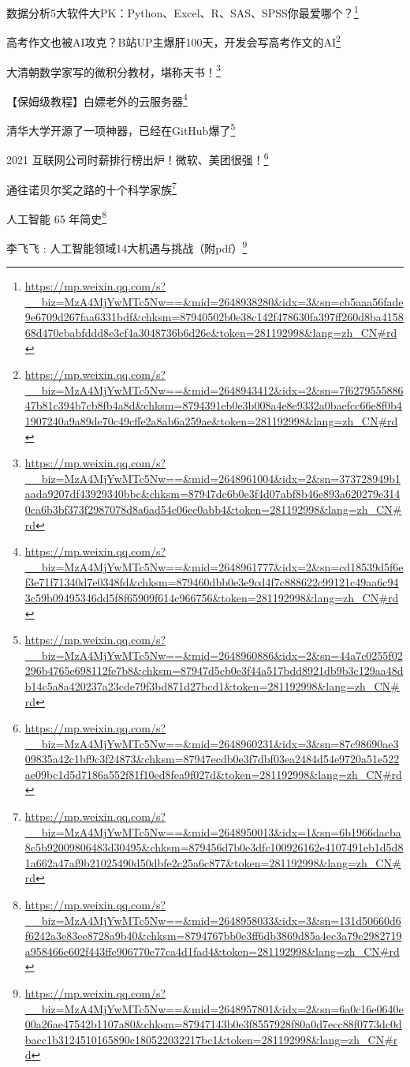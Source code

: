 \documentclass[]{ctexbook}
\renewcommand{\href}[2]{#2\footnote{\url{#1}}}
\begin{document}
\href{https://mp.weixin.qq.com/s?__biz=MzA4MjYwMTc5Nw==\&mid=2648938280\&idx=3\&sn=cb5aaa56fade9e6709d267faa6331bdf\&chksm=87940502b0e38c142f478630fa397ff260d8ba415868d470cbabfddd8e3cf4a3048736b6d26e\&token=281192998\&lang=zh_CN\#rd}{数据分析5大软件大PK：Python、Excel、R、SAS、SPSS你最爱哪个？}

\href{https://mp.weixin.qq.com/s?__biz=MzA4MjYwMTc5Nw==\&mid=2648943412\&idx=2\&sn=7f627955588647b81c394b7cb8fb4a8d\&chksm=8794391eb0e3b008a4e8e9332a0baefcc66e8f0b41907240a9a89de70c49cffe2a8ab6a259ae\&token=281192998\&lang=zh_CN\#rd}{高考作文也被AI攻克？B站UP主爆肝100天，开发会写高考作文的AI}

\href{https://mp.weixin.qq.com/s?__biz=MzA4MjYwMTc5Nw==\&mid=2648961004\&idx=2\&sn=373728949b1aada9207df43929340bbc\&chksm=87947dc6b0e3f4d07abf8b46e893a620279e3140ca6b3bf373f2987078d8a6ad54c06ec0abb4\&token=281192998\&lang=zh_CN\#rd}{大清朝数学家写的微积分教材，堪称天书！}

\href{https://mp.weixin.qq.com/s?__biz=MzA4MjYwMTc5Nw==\&mid=2648961777\&idx=2\&sn=cd18539d5f6ef3e71f71340d7e0348fd\&chksm=879460dbb0e3e9cd4f7c888622c99121c49aa6c943c59b09495346dd5f8f65909f614c966756\&token=281192998\&lang=zh_CN\#rd}{【保姆级教程】白嫖老外的云服务器}

\href{https://mp.weixin.qq.com/s?__biz=MzA4MjYwMTc5Nw==\&mid=2648960886\&idx=2\&sn=44a7c0255f02296b4765e698112fe7b8\&chksm=87947d5cb0e3f44a517bdd8921db9b3c129aa48db14c5a8a420237a23cde79f3bd871d27bcd1\&token=281192998\&lang=zh_CN\#rd}{清华大学开源了一项神器，已经在GitHub爆了}

\href{https://mp.weixin.qq.com/s?__biz=MzA4MjYwMTc5Nw==\&mid=2648960231\&idx=3\&sn=87c98690ae309835a42c1bf9c3f24873\&chksm=87947ecdb0e3f7dbf03ea2484d54e9720a51e522ae09bc1d5d7186a552f81f10ed8fea9f027d\&token=281192998\&lang=zh_CN\#rd}{2021 互联网公司时薪排行榜出炉！微软、美团很强！}

\href{https://mp.weixin.qq.com/s?__biz=MzA4MjYwMTc5Nw==\&mid=2648950013\&idx=1\&sn=6b1966dacba8c5b92009806483d30495\&chksm=879456d7b0e3dfc100926162e4107491eb1d5d81a662a47af9b21025490d50dbfe2c25a6c877\&token=281192998\&lang=zh_CN\#rd}{通往诺贝尔奖之路的十个科学家族}

\href{https://mp.weixin.qq.com/s?__biz=MzA4MjYwMTc5Nw==\&mid=2648958033\&idx=3\&sn=131d50660d6f6242a3e83ee8728a9b40\&chksm=8794767bb0e3ff6db3869d85a4ec3a79e2982719a958466e602f443ffe906770e77ca4d1fad4\&token=281192998\&lang=zh_CN\#rd}{人工智能 65 年简史}

\href{https://mp.weixin.qq.com/s?__biz=MzA4MjYwMTc5Nw==\&mid=2648957801\&idx=2\&sn=6a0c16e0640e00a26ae47542b1107a80\&chksm=87947143b0e3f8557928f80a0d7ecc88f0773dc0dbacc1b3124510165890c180522032217bc1\&token=281192998\&lang=zh_CN\#rd}{李飞飞 : 人工智能领域14大机遇与挑战（附pdf）}
\end{document}
